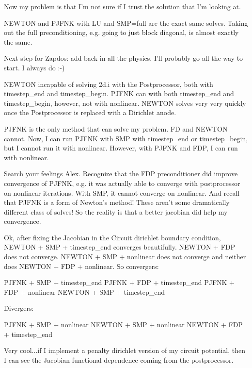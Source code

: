 {Now my problem is that I'm not sure if I trust the solution that I'm looking at.

NEWTON and PJFNK with LU and SMP=full are the exact same solves. Taking out the full preconditioning, e.g. going to just block diagonal, is almost exactly the same.

Next step for Zapdos: add back in all the physics. I'll probably go all the way to start. I always do :-)

NEWTON incapable of solving 2d.i with the Postprocessor, both with timestep\_end and timestep\_begin. PJFNK can with both timestep\_end and timestep\_begin, however, not with nonlinear. NEWTON solves very very quickly once the Postprocessor is replaced with a Dirichlet anode.

PJFNK is the only method that can solve my problem. FD and NEWTON cannot. Now, I can run PJFNK with SMP with timestep\_end or timestep\_begin, but I cannot run it with nonlinear. However, with PJFNK and FDP, I can run with nonlinear.

Search your feelings Alex. Recognize that the FDP preconditioner did improve convergence of PJFNK, e.g. it was actually able to converge with postprocessor on nonlinear iterations. With SMP, it cannot converge on nonlinear. And recall that PJFNK is a form of Newton's method! These aren't some dramatically different class of solves! So the reality is that a better jacobian did help my convergence.

Ok, after fixing the Jacobian in the Circuit dirichlet boundary condition, NEWTON + SMP + timestep\_end converges beautifully. NEWTON + FDP does not converge. NEWTON + SMP + nonlinear does not converge and neither does NEWTON + FDP + nonlinear. So convergers:

PJFNK + SMP + timestep\_end
PJFNK + FDP + timestep\_end
PJFNK + FDP + nonlinear
NEWTON + SMP + timestep\_end

Divergers:

PJFNK + SMP + nonlinear
NEWTON + SMP + nonlinear
NEWTON + FDP + timestep\_end

Very cool...if I implement a penalty dirichlet version of my circuit potential, then I can see the Jacobian functional dependence coming from the postprocessor.

}
